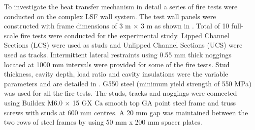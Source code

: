 To investigate the heat transfer mechanism in detail a series of fire tests were conducted on the complex LSF wall system. The test wall panels were constructed with frame dimensions of 3 m \(\times\) 3 m as shown in . Total of 10 full-scale fire tests were conducted for the experimental study. Lipped Channel Sections (LCS) were used as studs and Unlipped Channel Sections (UCS) were used as tracks. Intermittent lateral restraints using 0.55 mm thick noggings located at 1000 mm intervals were provided for some of the fire tests. Stud thickness, cavity depth, load ratio and cavity insulations were the variable parameters and are detailed in . G550 steel (minimum yield strength of 550 MPa) was used for all the fire tests.  The studs, tracks and noggings were connected using Buildex M6.0 \(\times\) 15 GX Ca smooth top GA point steel frame and truss screws with studs at 600 mm centres. A 20 mm gap was maintained between the two rows of steel frames by using 50 mm x 200 mm spacer plates. 

